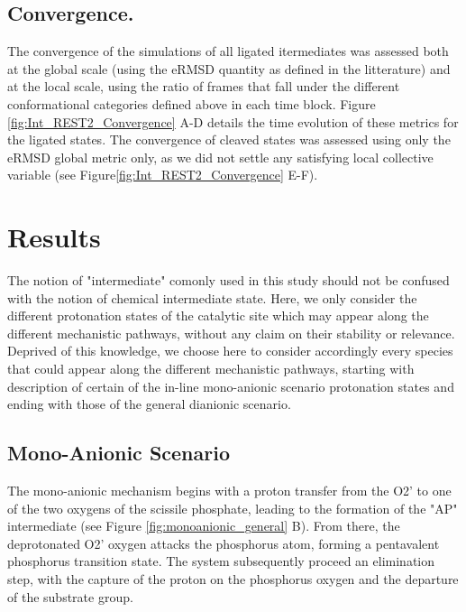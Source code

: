 \documentclass[journal=jacsat,manuscript=article]{achemso}
\begin{document}
\subsection{Convergence.}

The convergence of the simulations of all ligated itermediates was assessed both at the global scale (using the eRMSD quantity as defined in the litterature)
and at the local scale, using the ratio of frames that fall under the different conformational categories defined above in each time block. 
Figure \ref{fig:Int_REST2_Convergence} A-D details the time evolution of these metrics for the ligated states.
The convergence of cleaved states was assessed using only the eRMSD global metric\cite{bottaro_role_2014} only, 
as  we did not settle any satisfying local collective variable (see Figure\ref{fig:Int_REST2_Convergence} E-F).





\section{Results} 

The notion of "intermediate" comonly used in this study should not be confused with the notion of chemical intermediate state. 
Here, we only consider the different protonation states of the catalytic site which may appear along the different mechanistic pathways,
without any claim on their stability or relevance. 
Deprived of this knowledge, we choose here to consider accordingly every species that could appear along the different mechanistic pathways,
starting with description of certain of the in-line mono-anionic scenario protonation states and ending with those of the general dianionic scenario.

\subsection{Mono-Anionic Scenario}

The mono-anionic mechanism begins with a proton transfer from the O2' to one of the two oxygens of the scissile phosphate,
leading to the formation of the "AP" intermediate (see Figure \ref{fig:monoanionic_general} B).
From there, the deprotonated O2' oxygen attacks the phosphorus atom, forming a pentavalent phosphorus transition state.
The system subsequently proceed an elimination step, with the capture of the proton on the phosphorus oxygen and the departure of the substrate group.
\end{document}
